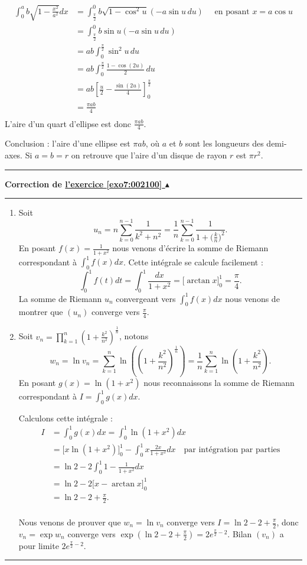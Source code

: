 \documentclass[11pt,a4paper]{article}
\newcounter{exo}
\newcommand{\correction}[1]{\hypertarget{cor7:#1}{}\label{cor7:#1}{\bf Correction de \hyperlink{exo7:#1}{l'exercice \ref{exo7:#1} $\blacktriangle$}}\vspace{1mm}\hrule\vspace{1mm}}
\newcommand{\fincorrection}{\vspace{1mm}\hrule\vspace*{7mm}}
\begin{document}
\begin{align*}
\int_0^a b\sqrt{1-\frac{x^2}{a^2}} dx
  & = \int_{\frac \pi 2}^0 b \sqrt{1-\cos^2 u} (-a \sin u \, du) \quad \text{ en posant } x=a \cos u \\
  & = \int_{\frac \pi 2}^0 b\sin u (-a \sin u \, du) \\
  & = ab \int_0^{\frac \pi 2} \sin^2 u \, du \\
  & = ab \int_0^{\frac \pi 2} \frac{1-\cos(2u)}{2} \, du \\ 
  &= ab \left[ \frac u2 - \frac{\sin(2u)}{4} \right]_0^{\frac \pi 2} \\
  &= \frac{\pi a b}{4} \\
\end{align*}
L'aire d'un quart d'ellipse est donc $\frac{\pi a b}{4}$. 

Conclusion : l'aire d'une ellipse est $\pi a b$, où $a$ et $b$ sont les longueurs des demi-axes.
Si $a=b=r$ on retrouve que l'aire d'un disque de rayon $r$ est $\pi r^2$.
\fincorrection
\correction{002100}
  \begin{enumerate}
  \item Soit 
$$u_n =n \sum_{k=0}^{n-1}\frac 1{k^2+n^2} = \frac 1n  \sum_{k=0}^{n-1}\frac 1{1+\big(\frac k n \big)^2}.$$
En posant $f(x) = \frac 1 {1+x^2}$ nous venons d'écrire la somme de Riemann correspondant à 
$\int_0^1 f(x) dx$. Cette intégrale se calcule facilement : 
$$\int_0^1 f(t) dt = \int_0^1 \frac {dx} {1+x^2} = \big[\arctan x\big]_0^1 = \frac \pi 4.$$
La somme de Riemann $u_n$ convergeant vers $\int_0^1 f(x) dx$ nous venons de montrer que
$(u_n)$ converge vers $\frac \pi 4$.

  \item Soit $v_n=\prod\limits_{k=1}^n\left(1+\frac{k^2}{n^2}\right) ^{\frac 1n}$, notons 
$$w_n = \ln v_n = \sum_{k=1}^n \ln\left( \left(1+\frac{k^2}{n^2}\right)^{\frac 1n} \right) 
= \frac 1 n \sum_{k=1}^n \ln \left(1+\frac{k^2}{n^2}\right).$$
En posant $g(x) = \ln (1+x^2)$ nous reconnaissons la somme de Riemann correspondant à
$I = \int_0^1 g(x)dx$.

Calculons cette intégrale : 
\begin{align*}
 I &= \int_0^1 g(x)dx = \int_0^1 \ln(1+x^2) dx \\
   &= \big[x\ln(1+x^2)\big]_0^1 - \int_0^1 x \frac{2x}{1+x^2}dx \quad \text{par intégration par parties} \\
   &= \ln 2 -2 \int_0^1 1-\frac 1{1+x^2} dx \\
   &= \ln 2  - 2\big[x-\arctan x\big]_0^1 \\
   &= \ln 2 - 2 + \frac \pi 2. \\
\end{align*}


Nous venons de prouver que $w_n=\ln v_n$ converge vers $I=\ln 2 - 2 + \frac \pi 2$,
donc $v_n = \exp w_n$ converge vers $\exp(\ln 2 - 2 + \frac \pi 2) = 2e^{\frac \pi 2 -2}$.
Bilan $(v_n)$ a pour limite $2e^{\frac \pi 2 -2}$.

  \end{enumerate}
\fincorrection
\end{document}
